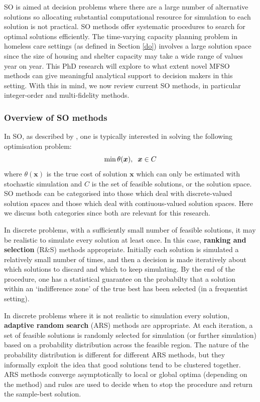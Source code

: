 \documentclass[12pt,a4paper]{article}
\begin{document}
SO is aimed at decision problems where there are a large number of alternative solutions so allocating substantial computational resource for simulation to each solution is not practical. SO methods offer systematic procedures to search for optimal solutions efficiently. The time-varying capacity planning problem in homeless care settings (as defined in Section \ref{do}) involves a large solution space since the size of housing and shelter capacity may take a wide range of values year on year. This PhD research will explore to what extent novel MFSO methods can give meaningful analytical support to decision makers in this setting. With this in mind, we now review current SO methods, in particular integer-order and multi-fidelity methods. 

\subsubsection{Overview of SO methods}\label{lit-review-so}

In SO, as described by \cite{nelson2021foundations}, one is typically interested in solving the following optimisation problem: 
%
\begin{equation}\label{SO_general}
    \min \theta(\boldsymbol{x}), \hspace{0.2cm} \boldsymbol{x} \in C
\end{equation}
%
where $\theta(\boldsymbol{x})$ is the true cost of solution $\boldsymbol{x}$ which can only be estimated with stochastic simulation and $C$ is the set of feasible solutions, or the solution space. SO methods can be categorised into those which deal with discrete-valued solution spaces and those which deal with contiuous-valued solution spaces. Here we discuss both categories since both are relevant for this research. 

In discrete problems, with a sufficiently small number of feasible solutions, it may be realistic to simulate every solution at least once. In this case, \textbf{ranking and selection} (R\&S) methods appropriate. Initially each solution is simulated a relatively small number of times, and then a decision is made iteratively about which solutions to discard and which to keep simulating. By the end of the procedure, one has a statistical guarantee on the probabilty that a solution within an `indifference zone' of the true best has been selected (in a frequentist setting).

In discrete problems where it is not realistic to simulation every solution, \textbf{adaptive random search} (ARS) methods are appropriate. At each iteration, a set of feasible solutions is randomly selected for simulation (or further simulation) based on a probability distribution across the feasible region. The nature of the probability distribution is different for different ARS methods, but they informally exploit the idea that good solutions tend to be clustered together. ARS methods converge asymptotically to local or global optima (depending on the method) and rules are used to decide when to stop the procedure and return the sample-best solution.
\end{document}
